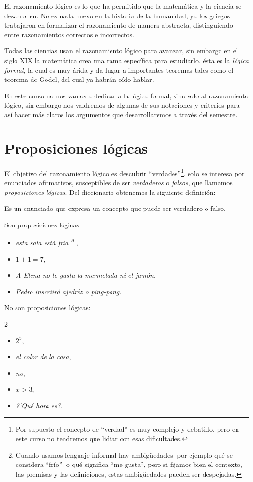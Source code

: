 
El razonamiento lógico es lo que ha permitido que la matemática y la ciencia se desarrollen. 
No es nada nuevo en la historia de la humanidad, 
ya los griegos trabajaron en formalizar el razonamiento de manera abstracta, 
distinguiendo entre razonamientos correctos e incorrectos. 

Todas las ciencias usan el razonamiento lógico para avanzar, 
sin embargo en el siglo 
XIX la matemática crea una rama específica para estudiarlo, 
\'esta es la {\em lógica formal}, la cual es muy árida y da lugar 
a importantes teoremas tales como el teorema de G\"odel, del cual 
ya habrán o\'ido hablar.

En este curso no nos vamos a dedicar a la lógica formal, 
sino solo al razonamiento lógico, sin embargo 
nos valdremos de algunas de sus notaciones y criterios 
para así hacer más claros los argumentos que desarrollaremos 
a través del semestre.

\section{Proposiciones lógicas}

El objetivo del razonamiento lógico es descubrir ``verdades''\footnote{Por supuesto el concepto de ``verdad'' es muy complejo y debatido, pero en este curso no tendremos que lidiar con esas dificultades.},
solo se interesa por enunciados afirmativos, susceptibles 
de ser {\em verdaderos} o {\em falsos}, que llamamos 
{\em proposiciones lógicas}.
Del diccionario obtenemos la siguiente definición:

\begin{defn}
Es un enunciado que expresa un concepto que puede ser verdadero o falso.
\end{defn}

\begin{ejemplo}
Son proposiciones l\'ogicas
\begin{itemize}
\item {\em esta sala est\'a fría
	\footnote{Cuando usamos lenguaje informal hay ambigüedades, 
		por ejemplo qué se considera ``frío'', 
		o qué significa ``me gusta'', 
		pero si fijamos bien el contexto, las premisas y las definiciones, 
		estas ambigüedades pueden ser despejadas.}
	},
\item {\em $1+1=7$},
\item {\em A Elena no le gusta la mermelada ni el jamón},
\item {\em Pedro inscriirá ajedréz o ping-pong}.
\end{itemize}
No son proposiciones l\'ogicas:
\begin{multicols}{2}
\begin{itemize}
\item {\em $2^5$},
\item {\em el color de la casa},
\item {\em no},
\item {\em $x > 3$},
\item {\em ?`Qu\'e hora es?}.
\end{itemize}
\end{multicols}
\end{ejemplo}


